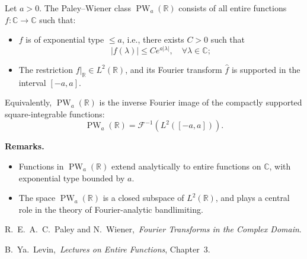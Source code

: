 \begin{definition}
\label{def:paley_wiener_class}
Let \( a > 0 \). The Paley--Wiener class \( \operatorname{PW}_a(\mathbb{R}) \) consists of all entire functions \( f \colon \mathbb{C} \to \mathbb{C} \) such that:
\begin{itemize}
  \item \( f \) is of exponential type \( \le a \), i.e., there exists \( C > 0 \) such that
  \[
  |f(\lambda)| \le C e^{a |\lambda|}, \quad \forall \lambda \in \mathbb{C};
  \]
  \item The restriction \( f|_{\mathbb{R}} \in L^2(\mathbb{R}) \), and its Fourier transform \( \widehat{f} \) is supported in the interval \( [-a, a] \).
\end{itemize}

\medskip
\noindent
Equivalently, \( \operatorname{PW}_a(\mathbb{R}) \) is the inverse Fourier image of the compactly supported square-integrable functions:
\[
\operatorname{PW}_a(\mathbb{R}) = \mathcal{F}^{-1}(L^2([-a, a])).
\]

\medskip
\noindent\textbf{Remarks.}
\begin{itemize}
  \item Functions in \( \operatorname{PW}_a(\mathbb{R}) \) extend analytically to entire functions on \( \mathbb{C} \), with exponential type bounded by \( a \).
  \item The space \( \operatorname{PW}_a(\mathbb{R}) \) is a closed subspace of \( L^2(\mathbb{R}) \), and plays a central role in the theory of Fourier-analytic bandlimiting.
\end{itemize}

\begin{references}
  \item R.~E.~A.~C.~Paley and N.~Wiener,\ \emph{Fourier Transforms in the Complex Domain}\cite{PaleyWiener1934Fourier}.
  \item B.~Ya.~Levin,\ \emph{Lectures on Entire Functions}, Chapter~3\cite{Levin1996EntireLectures}.
\end{references}
\end{definition}
